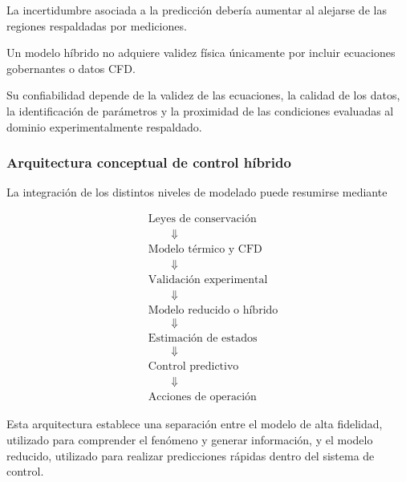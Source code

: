 La incertidumbre asociada a la predicción debería aumentar al alejarse de las regiones respaldadas por mediciones.

\begin{tcolorbox}[
title=Principio de validez,
colback=yellow!5,
colframe=orange!70!black
]
Un modelo híbrido no adquiere validez física únicamente por incluir ecuaciones gobernantes o datos CFD.

Su confiabilidad depende de la validez de las ecuaciones, la calidad de los datos, la identificación de parámetros y la proximidad de las condiciones evaluadas al dominio experimentalmente respaldado.
\end{tcolorbox}

\subsubsection{Arquitectura conceptual de control híbrido}

La integración de los distintos niveles de modelado puede resumirse mediante

\begin{equation}
\boxed{
\begin{aligned}
&\text{Leyes de conservación}
\\
&\qquad\Downarrow
\\
&\text{Modelo térmico y CFD}
\\
&\qquad\Downarrow
\\
&\text{Validación experimental}
\\
&\qquad\Downarrow
\\
&\text{Modelo reducido o híbrido}
\\
&\qquad\Downarrow
\\
&\text{Estimación de estados}
\\
&\qquad\Downarrow
\\
&\text{Control predictivo}
\\
&\qquad\Downarrow
\\
&\text{Acciones de operación}
\end{aligned}
}
\end{equation}

Esta arquitectura establece una separación entre el modelo de alta fidelidad, utilizado para comprender el fenómeno y generar información, y el modelo reducido, utilizado para realizar predicciones rápidas dentro del sistema de control.

